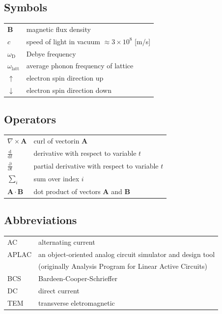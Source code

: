 \documentclass[english, 12pt, a4paper, elec, utf8, a-2b, online]{aaltothesis}
\begin{document}

\subsection*{Symbols}

\begin{tabular}{ll}
$\mathbf{B}$  & magnetic flux density  \\
$c$              & speed of light in vacuum $\approx 3\times10^8$ [m/s]\\
$\omega_{\mathrm{D}}$    & Debye frequency \\
$\omega_{\mathrm{latt}}$ & average phonon frequency of lattice \\
$\uparrow$       & electron spin direction up\\
$\downarrow$     & electron spin direction down
\end{tabular}

\subsection*{Operators}

\begin{tabular}{ll}
$\nabla \times \mathbf{A}$              & curl of vectorin $\mathbf{A}$\\
$\displaystyle\frac{\mbox{d}}{\mbox{d} t}$ & derivative with respect to 
variable $t$\\[3mm]
$\displaystyle\frac{\partial}{\partial t}$  & partial derivative with respect 
to variable $t$ \\[3mm]
$\sum_i $                       & sum over index $i$\\
$\mathbf{A} \cdot \mathbf{B}$    & dot product of vectors $\mathbf{A}$ and 
$\mathbf{B}$
\end{tabular}

\subsection*{Abbreviations}

\begin{tabular}{ll}
AC         & alternating current \\
APLAC      & an object-oriented analog circuit simulator and design tool \\
           & (originally Analysis Program for Linear Active Circuits) \\
BCS        & Bardeen-Cooper-Schrieffer \\ %
DC         & direct current \\
TEM        & transverse eletromagnetic
\end{tabular}
\end{document}
